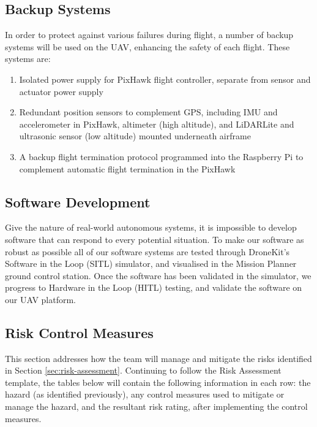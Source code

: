 \label{sec:risk-management}
\subsection{Backup Systems}
In order to protect against various failures during flight, a number of backup systems will be used on the UAV, enhancing the safety of each flight. These systems are:
\begin{enumerate}
	\item Isolated power supply for PixHawk flight controller, separate from sensor and actuator power supply
	\item Redundant position sensors to complement GPS, including IMU and accelerometer in PixHawk, altimeter (high altitude), and LiDARLite and ultrasonic sensor (low altitude) mounted underneath airframe
	\item A backup flight termination protocol programmed into the Raspberry Pi to complement automatic flight termination in the PixHawk
\end{enumerate}

\subsection{Software Development}
Give the nature of real-world autonomous systems, it is impossible to develop software that can respond to every potential situation. To make our software as robust as possible all of our software systems are tested through DroneKit's Software in the Loop (SITL) simulator, and visualised in the Mission Planner ground control station. Once the software has been validated in the simulator, we progress to Hardware in the Loop (HITL) testing, and validate the software on our UAV platform.

\subsection{Risk Control Measures}
This section addresses how the team will manage and mitigate the risks identified in Section \ref{sec:risk-assessment}. Continuing to follow the Risk Assessment template, the tables below will contain the following information in each row: the hazard (as identified previously), any control measures used to mitigate or manage the hazard, and the resultant risk rating, after implementing the control measures.\\

